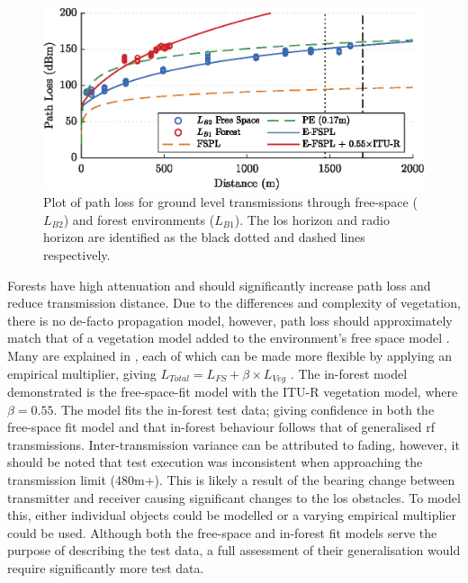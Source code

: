 \begin{figure}[H]
    \centering
   	\includegraphics{Figures/distance_pl_plot}
    \caption[Effect of Distance on ground level Path Loss]{
    	Plot of path loss for ground level transmissions through free-space ($L_{B2}$) and forest environments ($L_{B1}$). The \ac{los} horizon and radio horizon are identified as the black dotted and dashed lines respectively.
    }
    \label{fig:distance_pl_plot}
\end{figure}

Forests have high attenuation and should significantly increase path loss and reduce transmission distance. Due to the differences and complexity of vegetation, there is no de-facto propagation model, however, path loss should approximately match that of a vegetation model added to the environment's free space model \cite{3YP:COMBINING_MODELS}.  Many are explained in \cite{3YP:PROP_MODELS}, each of which can be made more flexible by applying an empirical multiplier, giving $L_{Total} = L_{FS} + \beta \times L_{Veg}$ \cite{3YP:EMPIRICAL_MULTIPLIER}. The in-forest model demonstrated is the free-space-fit model with the ITU-R vegetation model, where $\beta=0.55$. The model fits the in-forest test data; giving confidence in both the free-space fit model and that in-forest behaviour follows that of generalised \ac{rf} transmissions. Inter-transmission variance can be attributed to fading, however, it should be noted that test execution was inconsistent when approaching the transmission limit (480m+). This is likely a result of the bearing change between transmitter and receiver causing significant changes to the \ac{los} obstacles. To model this, either individual objects could be modelled or a varying empirical multiplier could be used. Although both the free-space and in-forest fit models serve the purpose of describing the test data, a full assessment of their generalisation would require significantly more test data.

